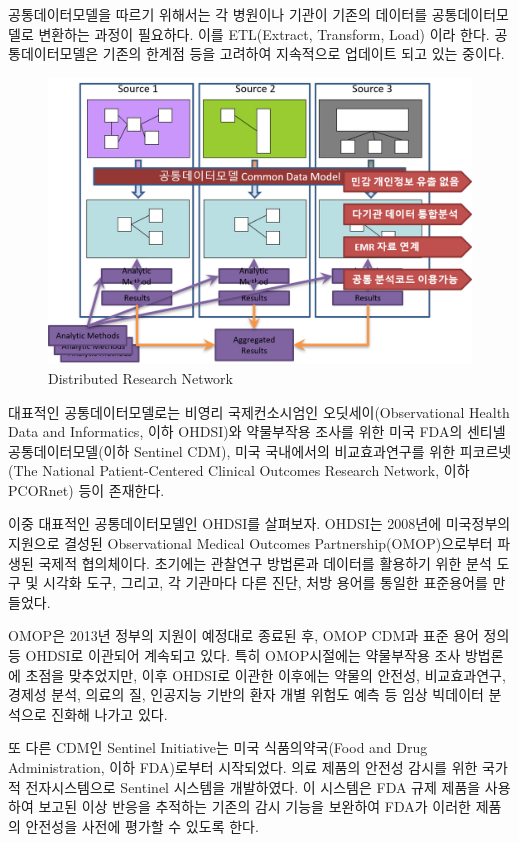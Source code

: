 \documentclass[]{book}
\begin{document}
공통데이터모델을 따르기 위해서는 각 병원이나 기관이 기존의 데이터를 공통데이터모델로 변환하는 과정이 필요하다. 이를 ETL(Extract, Transform, Load) 이라 한다. 공통데이터모델은 기존의 한계점 등을 고려하여 지속적으로 업데이트 되고 있는 중이다.

\begin{figure}
\includegraphics[width=0.75\linewidth]{images/OhdsiCommunity/CDM_DRN_1} \caption{Distributed Research Network}\label{fig:DRN}
\end{figure}

대표적인 공통데이터모델로는 비영리 국제컨소시엄인 오딧세이(Observational Health Data and Informatics, 이하 OHDSI)와 약물부작용 조사를 위한 미국 FDA의 센티넬 공통데이터모델(이하 Sentinel CDM), 미국 국내에서의 비교효과연구를 위한 피코르넷(The National Patient-Centered Clinical Outcomes Research Network, 이하 PCORnet) 등이 존재한다.

이중 대표적인 공통데이터모델인 OHDSI를 살펴보자. OHDSI는 2008년에 미국정부의 지원으로 결성된 Observational Medical Outcomes Partnership(OMOP)으로부터 파생된 국제적 협의체이다. 초기에는 관찰연구 방법론과 데이터를 활용하기 위한 분석 도구 및 시각화 도구, 그리고, 각 기관마다 다른 진단, 처방 용어를 통일한 표준용어를 만들었다.

OMOP은 2013년 정부의 지원이 예정대로 종료된 후, OMOP CDM과 표준 용어 정의 등 OHDSI로 이관되어 계속되고 있다. 특히 OMOP시절에는 약물부작용 조사 방법론에 초점을 맞추었지만, 이후 OHDSI로 이관한 이후에는 약물의 안전성, 비교효과연구, 경제성 분석, 의료의 질, 인공지능 기반의 환자 개별 위험도 예측 등 임상 빅데이터 분석으로 진화해 나가고 있다.

또 다른 CDM인 Sentinel Initiative는 미국 식품의약국(Food and Drug Administration, 이하 FDA)로부터 시작되었다. 의료 제품의 안전성 감시를 위한 국가적 전자시스템으로 Sentinel 시스템을 개발하였다. 이 시스템은 FDA 규제 제품을 사용하여 보고된 이상 반응을 추적하는 기존의 감시 기능을 보완하여 FDA가 이러한 제품의 안전성을 사전에 평가할 수 있도록 한다.
\end{document}
